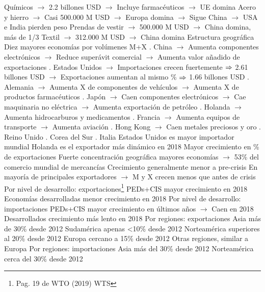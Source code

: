 \documentclass{nuevotema}
\begin{document}
\begin{esquemal}
				\4[3.] Químicos
				\4[] $\to$ 2.2 billones USD
				\4[] $\to$ Incluye farmacéuticos
				\4[] $\to$ UE domina
				\4[4.] Acero y hierro
				\4[] $\to$ Casi 500.000 M USD
				\4[] $\to$ Europa domina
				\4[] $\to$ Sigue China
				\4[] $\to$ USA e India pierden peso
				\4[5.] Prendas de vestir
				\4[] $\to$ 500.000 M USD
				\4[] $\to$ China domina, más de 1/3
				\4[6.] Textil
				\4[] $\to$ 312.000 M USD
				\4[] $\to$ China domina
			\3 Estructura geográfica
				\4 Diez mayores economías por volúmenes M+X
				. China
				\4[] $\to$ Aumenta componentes electrónicos
				\4[] $\to$ Reduce superávit comercial
				\4[] $\to$ Aumenta valor añadido de exportaciones
				. Estados Unidos
				\4[] $\to$ Importaciones crecen fuertemente
				\4[] $\Rightarrow$ 2.61 billones USD
				\4[] $\to$ Exportaciones aumentan al mismo \%
				\4[] $\Rightarrow$ 1.66 billones USD
				. Alemania
				\4[] $\to$ Aumenta X de componentes de vehículos
				\4[] $\to$ Aumenta X de productos farmacéuticos
				. Japón
				\4[] $\to$ Caen componentes electrónicos
				\4[] $\to$ Cae maquinaria no eléctrica
				\4[] $\to$ Aumenta exportación de petróleo
				. Holanda
				\4[] $\to$ Aumenta hidrocarburos y medicamentos
				. Francia
				\4[] $\to$ Aumenta equipos de transporte
				\4[] $\to$ Aumenta aviación
				. Hong Kong
				\4[] $\to$ Caen metales preciosos y oro
				. Reino Unido
				. Corea del Sur
				. Italia
				\4 Estados Unidos es mayor importador mundial
				\4 Holanda es el exportador más dinámico en 2018
				\4[] Mayor crecimiento en \% de exportaciones
				\4 Fuerte concentración geográfica
				 mayores economías
				\4[] $\to$ 53\% del comercio mundial de mercancías
				\4 Crecimiento generalmente menor a pre-crisis
				\4[] En mayoría de principales exportadores
				\4[] $\to$ M y X crecen menos que antes de crisis
				\4 Por nivel de desarrollo: exportaciones\footnote{Pag. 19 de WTO (2019) WTS}
				\4[] PEDs+CIS mayor crecimiento en 2018
				\4[] Economías desarrolladas menor crecimiento en 2018
				\4 Por nivel de desarrollo: importaciones
				\4[] PEDs+CIS mayor crecimiento en últimos años
				\4[] $\to$ Caen en 2018
				\4[] Desarrollados crecimiento más lento en 2018
				\4 Por regiones: exportaciones
				\4[] Asia más de 30\% desde 2012
				\4[] Sudamérica apenas <10\% desde 2012
				\4[] Norteamérica superiores al 20\% desde 2012
				\4[] Europa cercano a 15\% desde 2012
				\4[] Otras regiones, similar a Europa
				\4 Por regiones: importaciones
				\4[] Asia más del 30\% desde 2012
				\4[] Norteamérica cerca del 30\% desde 2012

\end{esquemal}
\end{document}
